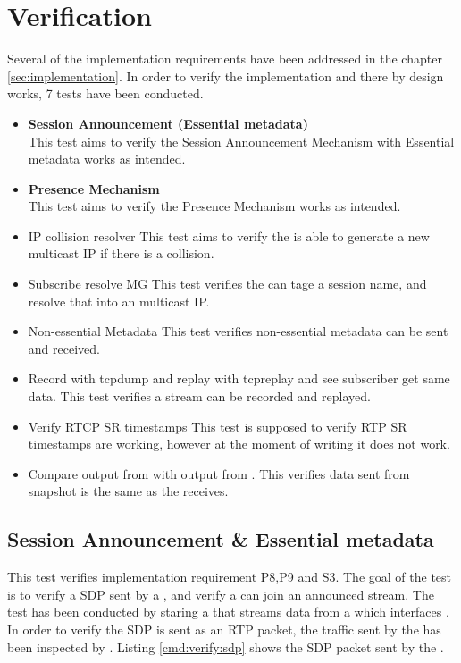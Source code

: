 \section{Verification} \label{sec:design:verification}
Several of the implementation requirements have been addressed in the chapter \ref{sec:implementation}. In order to verify the implementation and there by design works, 7 tests have been conducted.

\begin{itemize}
	\item \textbf{Session Announcement (Essential metadata)}\\
This test aims to verify the Session Announcement Mechanism with Essential metadata works as intended.
	\item \textbf{Presence Mechanism}\\
This test aims to verify the Presence Mechanism works as intended.
	\item IP collision resolver
This test aims to verify the \pub{} is able to generate a new multicast IP if there is a collision.
	\item Subscribe resolve MG
This test verifies the \sub{} can tage a session name, and resolve that into an multicast IP.
	\item Non-essential Metadata
This test verifies non-essential metadata can be sent and received.
	\item Record with tcpdump and replay with tcpreplay and see subscriber get same data.
This test verifies a stream can be recorded and replayed.
	\item Verify RTCP SR timestamps
This test is supposed to verify RTP SR timestamps are working, however at the moment of writing it does not work.
	\item Compare output from \con{} with output from .
This verifies data sent from snapshot is the same as the \con{} receives.
\end{itemize}


\subsection{Session Announcement \& Essential metadata} \label{sec:verify:sessionannouncement}
This test verifies implementation requirement P8,P9 and S3. The goal of the test is to verify a SDP sent by a \pub{}, and verify a \sub{} can join an announced stream. 
The test has been conducted by staring a \pub{} that streams data from a \con{} which interfaces . In order to verify the SDP is sent as an RTP packet, the traffic sent by the \pub{} has been inspected by . Listing \ref{cmd:verify:sdp} shows the SDP packet sent by the \pub{}.

